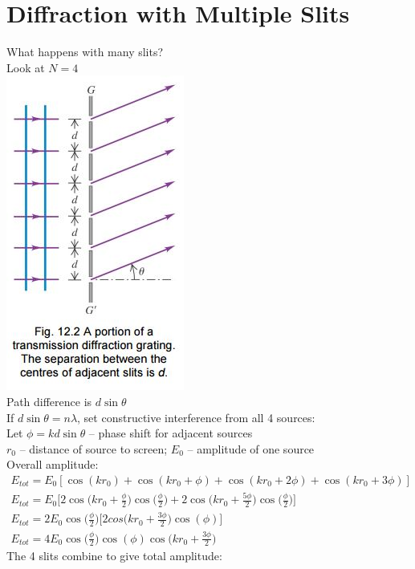 \documentclass[a4paper, 11pt, fleqn, normalem]{report}
\begin{document}
\section{Diffraction with Multiple Slits}
What happens with many slits? \\
Look at $N = 4$ \\
\includegraphics[scale=0.8]{Grating.jpg} \\
Path difference is $d\sin{\theta}$ \\
If $d\sin{\theta} = n\lambda$, set constructive interference from all 4 sources: \\
Let $\phi = kd\sin{\theta}$ -- phase shift for adjacent sources \\
$r_{0}$ -- distance of source to screen; $E_{0}$ -- amplitude of one source \\
Overall amplitude:
\begin{gather*}
    E_{tot} = E_{0}[\cos{(kr_{0})} + \cos{(kr_{0} + \phi)} + \cos{(kr_{0} + 2\phi)} + \cos{(kr_{0} + 3\phi)}] \\
    E_{tot} = E_{0}\bigg[2\cos{\big(kr_{0} + \tfrac{\phi}{2}\big)}\cos{\big(\tfrac{\phi}{2}\big)} + 2\cos{\big(kr_{0} + \tfrac{5\phi}{2}\big)}\cos{\big(\tfrac{\phi}{2}\big)}\bigg] \\
    E_{tot} = 2E_{0}\cos{\big(\tfrac{\phi}{2}\big)}\bigg[2cos{\big(kr_{0} + \tfrac{3\phi}{2}\big)}\cos{(\phi)}\bigg] \\
    E_{tot} = 4E_{0}\cos{\big(\tfrac{\phi}{2}\big)}\cos{(\phi)}\cos{\big(kr_{0} + \tfrac{3\phi}{2}\big)}
\end{gather*}
The 4 slits combine to give total amplitude:
\end{document}
